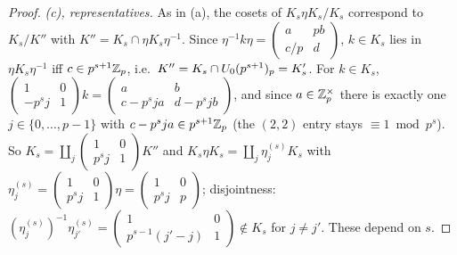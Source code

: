 \begin{proof}
\emph{(c), representatives.} As in (a), the cosets of $K_s\eta K_s/K_s$ correspond to $K_s/K''$ with
$K''=K_s\cap\eta K_s\eta^{-1}$. Since $\eta^{-1}k\eta=\left(\begin{smallmatrix}a&pb\\c/p&d\end{smallmatrix}\right)$, $k\in K_s$ lies in
$\eta K_s\eta^{-1}$ iff $c\in p^{s+1}\mathbb{Z}_p$, i.e.\ $K''=K_s\cap U_0(p^{s+1})_p=K'_{s}$. For $k\in K_s$,
$\left(\begin{smallmatrix}1&0\\-p^sj&1\end{smallmatrix}\right)k=\left(\begin{smallmatrix}a&b\\c-p^sja&d-p^sjb\end{smallmatrix}\right)$, and since $a\in\mathbb{Z}_p^\times$
there is exactly one $j\in\{0,\dots,p-1\}$ with $c-p^sja\in p^{s+1}\mathbb{Z}_p$ (the $(2,2)$ entry stays $\equiv1\bmod p^s$). So
$K_s=\coprod_j\left(\begin{smallmatrix}1&0\\p^sj&1\end{smallmatrix}\right)K''$ and $K_s\eta K_s=\coprod_j\eta^{(s)}_jK_s$ with
$\eta^{(s)}_j=\left(\begin{smallmatrix}1&0\\p^sj&1\end{smallmatrix}\right)\eta=\left(\begin{smallmatrix}1&0\\p^sj&p\end{smallmatrix}\right)$; disjointness:
$(\eta^{(s)}_j)^{-1}\eta^{(s)}_{j'}=\left(\begin{smallmatrix}1&0\\p^{s-1}(j'-j)&1\end{smallmatrix}\right)\notin K_s$ for $j\ne j'$. These depend on $s$.


\end{proof}
